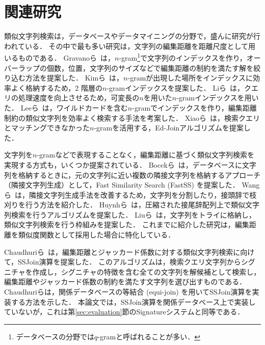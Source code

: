 \documentclass[japanese]{jnlp_JS2.0}
\begin{document}
\section{関連研究}
\label{sec:related-work}

類似文字列検索は，データベースやデータマイニングの分野で，盛んに研究が行われている．
その中で最も多い研究は，文字列の編集距離を距離尺度として用いるものである．
Gravanoら~\cite{Gravano:01}は，$n$-gram\footnote{データベースの分野では$q$-gramと呼ばれることが多い．}で文字列のインデックスを作り，オーバーラップの個数，位置，文字列のサイズなどで編集距離の制約を満たす解を絞り込む方法を提案した．
Kimら~\cite{Kim:05}は，$n$-gramが出現した場所をインデックスに効率よく格納するため，2 階層の$n$-gramインデックスを提案した．
Liら~\cite{Li:07}は，クエリの処理速度を向上させるため，可変長の$n$を用いた$n$-gramインデックスを用いた．
Leeら~\cite{Lee:07}は，ワイルドカードを含む$n$-gramでインデックスを作り，編集距離制約の類似文字列を効率よく検索する手法を考案した．
Xiaoら~\cite{Xiao:08}は，検索クエリとマッチングできなかった$n$-gramを活用する，Ed-Joinアルゴリズムを提案した．

文字列を$n$-gramなどで表現することなく，編集距離に基づく類似文字列検索を実現する方式も，いくつか提案されている．
Bocekら~\cite{Bocek:07}は，データベースに文字列を格納するときに，元の文字列に近い複数の隣接文字列を格納するアプローチ（隣接文字列生成）として，Fast Similarity Search (FastSS) を提案した．
Wangら~\cite{Wang:09}は，隣接文字列生成手法を改善するため，文字列を分割したり，接頭辞で枝刈りを行う方法を紹介した．
Huynhら~\cite{Huynh:06}は，圧縮された接尾辞配列上で類似文字列検索を行うアルゴリズムを提案した．
Liuら~\cite{Liu:08}は，文字列をトライに格納し，類似文字列検索を行う枠組みを提案した．
これまでに紹介した研究は，編集距離を類似度関数として採用した場合に特化している．

Chaudhuriら~\cite{Chaudhuri:06}は，編集距離とジャッカード係数に対する類似文字列検索に向けて，SSJoin演算を提案した．
このアルゴリズムは，検索クエリ文字列からシグニチャを作成し，シグニチャの特徴を含む全ての文字列を解候補として検索し，編集距離やジャッカード係数の制約を満たす文字列を選び出すものである．
Chaudhuriらは，関係データベースの等結合 (equi-join) を用いてSSJoin演算を実装する方法を示した．
本論文では，SSJoin演算を関係データベース上で実装していないが，これは第\ref{sec:evaluation}節のSignatureシステムと同等である．
\end{document}
